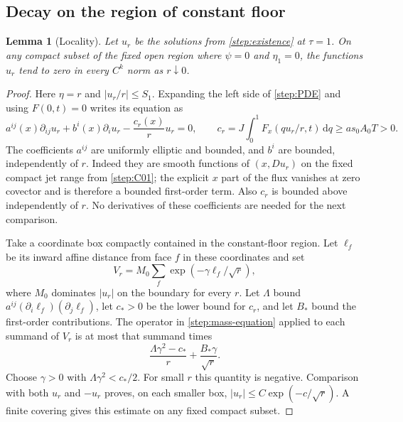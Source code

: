 \documentclass[11pt]{article}
\numberwithin{equation}{section}
\newtheorem{lemma}[theorem]{Lemma}
\theoremstyle{definition}
\theoremstyle{remark}
\begin{document}
\subsection{Decay on the region of constant floor}

\begin{lemma}[Locality]\label{step:locality}
Let $u_r$ be the solutions from \cref{step:existence} at $\tau=1$.
On any compact subset of the fixed open region where $\psi=0$ and
$\eta_1=0$, the functions $u_r$ tend to zero in every $C^k$ norm as
$r\downarrow0$.
\end{lemma}

\begin{proof}
Here $\eta=r$ and $|u_r/r|\le S_1$.  Expanding the left side of
\cref{step:PDE} and using $F(0,t)=0$ writes its equation as
\begin{equation}\label{step:mass-equation}
 a^{ij}(x)\partial_{ij}u_r+b^i(x)\partial_i u_r
 -\frac{c_r(x)}r u_r=0,
 \qquad
 c_r=J\int_0^1F_x(qu_r/r,t)\,\mathrm d q\ge as_0A_0T>0.
\end{equation}
The coefficients $a^{ij}$ are uniformly elliptic and bounded, and $b^i$
are bounded, independently of $r$.  Indeed they are smooth functions of
$(x,Du_r)$ on the fixed compact jet range from \cref{step:C01}; the
explicit $x$ part of the flux vanishes at zero covector and is therefore
a bounded first-order term.  Also $c_r$ is bounded above independently
of $r$.  No derivatives of these coefficients are needed for the next
comparison.

Take a coordinate box compactly contained in the constant-floor region.
Let $\ell_f$ be its inward affine distance from face $f$ in these
coordinates and set
\[
 V_r=M_0\sum_f\exp(-\gamma\ell_f/\sqrt r),
\]
where $M_0$ dominates $|u_r|$ on the boundary for every $r$.
Let $\Lambda$ bound $a^{ij}(\partial_i\ell_f)(\partial_j\ell_f)$,
let $c_*>0$ be the lower bound for $c_r$, and let $B_*$ bound the
first-order contributions.  The operator in \cref{step:mass-equation}
applied to each summand of $V_r$ is at most that summand times
\[
 \frac{\Lambda\gamma^2-c_*}{r}+\frac{B_*\gamma}{\sqrt r}.
\]
Choose $\gamma>0$ with $\Lambda\gamma^2<c_*/2$.  For small $r$ this
quantity is negative.  Comparison with both $u_r$ and $-u_r$ proves,
on each smaller box, $|u_r|\le C\exp(-c/\sqrt r)$.  A finite covering
gives this estimate on any fixed compact subset.


\end{proof}
\end{document}
